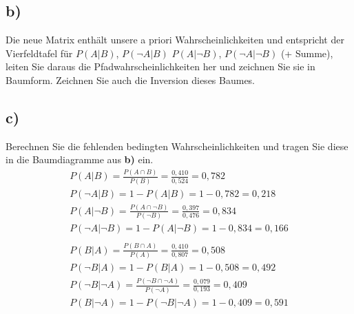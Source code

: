 \documentclass[12pt, a4paper]{article}
\begin{document}
\subsection*{b)}
Die neue Matrix enthält unsere a priori Wahrscheinlichkeiten und entspricht der Vierfeldtafel
für $P(A|B)$, $P(\neg A|B)$ $P(A | \neg B)$, $P(\neg A|\neg B)$ (+ Summe), leiten Sie daraus die
Pfadwahrscheinlichkeiten her und zeichnen Sie sie in Baumform. Zeichnen Sie auch die
Inversion dieses Baumes.
\vspace{0.3cm}

\subsection*{c)}
Berechnen Sie die fehlenden bedingten Wahrscheinlichkeiten und tragen Sie diese in die Baumdiagramme aus \textbf{b)} ein.
\begin{align}
P(A | B) = \frac{P(A \cap B)}{P(B)} = \frac{0,410}{0,524} = 0,782 \\
P(\neg A | B) = 1 - P(A | B) = 1 - 0,782 = 0,218 \\
P(A | \neg B) = \frac{P(A \cap \neg B)}{P(\neg B)} = \frac{0,397}{0,476} = 0,834 \\
P(\neg A | \neg B) = 1 - P(A | \neg B) = 1 - 0,834 = 0,166 \\\\
P(B | A) = \frac{P(B \cap A)}{P(A)} = \frac{0,410}{0,807} = 0,508 \\
P(\neg B | A) = 1 - P(B | A) = 1 - 0,508 = 0,492 \\
P(\neg B | \neg A) = \frac{P(\neg B \cap \neg A)}{P(\neg A)} = \frac{0,079}{0,193} = 0,409 \\
P(B | \neg A) = 1 - P(\neg B | \neg A) = 1 - 0,409 = 0,591
\end{align}
\vspace{0.3cm}
\end{document}
